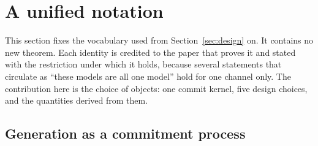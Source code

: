 \section{A unified notation}
\label{sec:notation}

This section fixes the vocabulary used from Section~\ref{sec:design} on. It contains no new theorem. Each identity is credited to the paper that proves it and stated with the restriction under which it holds, because several statements that circulate as ``these models are all one model'' hold for one channel only. %
The contribution here is the choice of objects: one commit kernel, five design choices, and the quantities derived from them.

\subsection{Generation as a commitment process}
\label{sec:notation-process}

